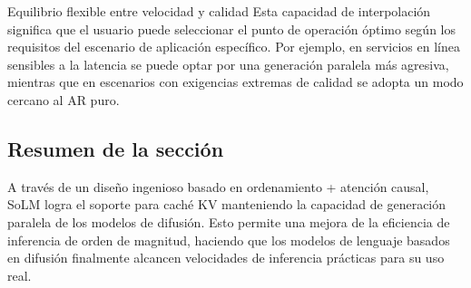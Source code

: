 \begin{knowledgebox}{Equilibrio flexible entre velocidad y calidad}
Esta capacidad de interpolación significa que el usuario puede seleccionar el punto de operación óptimo según los requisitos del escenario de aplicación específico. Por ejemplo, en servicios en línea sensibles a la latencia se puede optar por una generación paralela más agresiva, mientras que en escenarios con exigencias extremas de calidad se adopta un modo cercano al AR puro.
\end{knowledgebox}

\subsection{Resumen de la sección}

A través de un diseño ingenioso basado en ordenamiento + atención causal, SoLM logra el soporte para caché KV manteniendo la capacidad de generación paralela de los modelos de difusión. Esto permite una mejora de la eficiencia de inferencia de orden de magnitud, haciendo que los modelos de lenguaje basados en difusión finalmente alcancen velocidades de inferencia prácticas para su uso real.

\newpage
